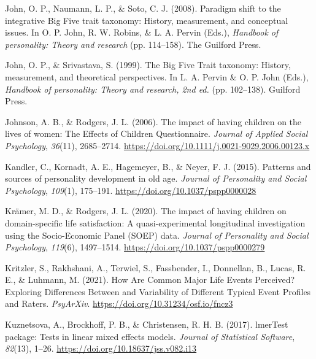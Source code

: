 \documentclass[
  english,
  man, noextraspace]{apa7}
\begin{document}
\leavevmode\hypertarget{ref-johnParadigmShiftIntegrative2008}{}%
John, O. P., Naumann, L. P., \& Soto, C. J. (2008). Paradigm shift to the integrative Big Five trait taxonomy: History, measurement, and conceptual issues. In O. P. John, R. W. Robins, \& L. A. Pervin (Eds.), \emph{Handbook of personality: Theory and research} (pp. 114--158). The Guilford Press.

\leavevmode\hypertarget{ref-johnBigFiveTrait1999}{}%
John, O. P., \& Srivastava, S. (1999). The Big Five Trait taxonomy: History, measurement, and theoretical perspectives. In L. A. Pervin \& O. P. John (Eds.), \emph{Handbook of personality: Theory and research, 2nd ed.} (pp. 102--138). Guilford Press.

\leavevmode\hypertarget{ref-johnsonImpactHavingChildren2006}{}%
Johnson, A. B., \& Rodgers, J. L. (2006). The impact of having children on the lives of women: The Effects of Children Questionnaire. \emph{Journal of Applied Social Psychology}, \emph{36}(11), 2685--2714. \url{https://doi.org/10.1111/j.0021-9029.2006.00123.x}

\leavevmode\hypertarget{ref-kandlerPatternsSourcesPersonality2015a}{}%
Kandler, C., Kornadt, A. E., Hagemeyer, B., \& Neyer, F. J. (2015). Patterns and sources of personality development in old age. \emph{Journal of Personality and Social Psychology}, \emph{109}(1), 175--191. \url{https://doi.org/10.1037/pspp0000028}

\leavevmode\hypertarget{ref-kramerImpactHavingChildren2020}{}%
Krämer, M. D., \& Rodgers, J. L. (2020). The impact of having children on domain-specific life satisfaction: A quasi-experimental longitudinal investigation using the Socio-Economic Panel (SOEP) data. \emph{Journal of Personality and Social Psychology}, \emph{119}(6), 1497--1514. \url{https://doi.org/10.1037/pspp0000279}

\leavevmode\hypertarget{ref-kritzlerHowAreCommon2021}{}%
Kritzler, S., Rakhshani, A., Terwiel, S., Fassbender, I., Donnellan, B., Lucas, R. E., \& Luhmann, M. (2021). How Are Common Major Life Events Perceived? Exploring Differences Between and Variability of Different Typical Event Profiles and Raters. \emph{PsyArXiv}. \url{https://doi.org/10.31234/osf.io/fncz3}

\leavevmode\hypertarget{ref-R-lmerTest}{}%
Kuznetsova, A., Brockhoff, P. B., \& Christensen, R. H. B. (2017). lmerTest package: Tests in linear mixed effects models. \emph{Journal of Statistical Software}, \emph{82}(13), 1--26. \url{https://doi.org/10.18637/jss.v082.i13}
\end{document}

